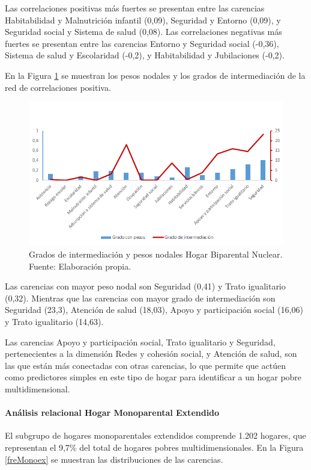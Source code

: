 \documentclass[12pt,letterpaper,spanish]{article}
\begin{document}
Las correlaciones positivas más fuertes se presentan entre las carencias Habitabilidad y Malnutrición infantil (0,09), Seguridad y Entorno (0,09), y Seguridad social y Sistema de salud (0,08). Las correlaciones negativas más fuertes se presentan entre las carencias Entorno y Seguridad social (-0,36), Sistema de salud y Escolaridad (-0,2), y Habitabilidad y Jubilaciones (-0,2).

En la Figura \ref{CenBinuc} se muestran los pesos nodales y los grados de intermediación de la red de correlaciones positiva. 
\begin{figure}[H]
    \centering
    \includegraphics[width=\textwidth]{Grafos/nc_binuc.png}
    \caption{Grados de intermediación y pesos nodales Hogar Biparental Nuclear. Fuente: Elaboración propia.}
    \label{CenBinuc}
\end{figure}
Las carencias con mayor peso nodal son Seguridad (0,41) y Trato igualitario (0,32). Mientras que las carencias con mayor grado de intermediación son Seguridad (23,3), Atención de salud (18,03), Apoyo y participación social (16,06) y Trato igualitario (14,63).

Las carencias Apoyo y participación social, Trato igualitario y Seguridad, pertenecientes a la dimensión Redes y cohesión social, y Atención de salud, son las que están más conectadas con otras carencias, lo que permite que actúen como predictores simples en este tipo de hogar para identificar a un hogar pobre multidimensional.  

\paragraph{Análisis relacional Hogar Monoparental Extendido}

El subgrupo de hogares monoparentales extendidos comprende 1.202 hogares, que representan el 9,7\% del total de hogares pobres multidimensionales. En la Figura \ref{freMonoex} se muestran las distribuciones de las carencias.
\end{document}
